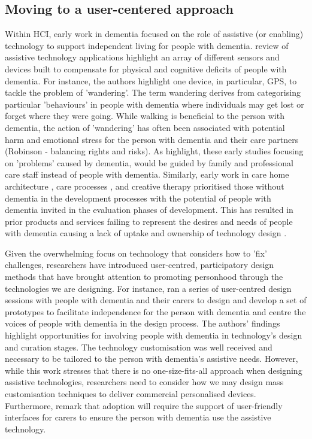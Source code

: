 \subsection{Moving to a user-centered approach}
\label{BL:Tech}
Within HCI, early work in dementia focused on the role of assistive (or enabling) technology to support independent living for people with dementia. \cite{bharucha2009intelligent} review of assistive technology applications highlight an array of different sensors and devices built to compensate for physical and cognitive deficits of people with dementia. For instance, the authors highlight one device, in particular, GPS, to tackle the problem of 'wandering'. The term wandering derives from categorising particular 'behaviours' in people with dementia where individuals may get lost or forget where they were going. While walking is beneficial to the person with dementia, the action of 'wandering' has often been associated with potential harm and emotional stress for the person with dementia and their care partners (Robinson - balancing rights and risks). As \cite{bharucha2009intelligent} highlight, these early studies focusing on 'problems' caused by dementia, would be guided by family and professional care staff instead of people with dementia. Similarly, early work in care home architecture \citep{torrington2006has}, care processes \citep{rabins2006practical}, and creative therapy \citep{schmitt2006creative} prioritised those without dementia in the development processes with the potential of people with dementia invited in the evaluation phases of development. This has resulted in prior products and services failing to represent the desires and needs of people with dementia causing a lack of uptake and ownership of technology design \citep{gibson2019personalisation}. 

Given the overwhelming focus on technology that considers how to 'fix' challenges, researchers have introduced user-centred, participatory design methods that have brought attention to promoting personhood through the technologies we are designing. For instance, \cite{robinson2009keeping} ran a series of user-centred design sessions with people with dementia and their carers to design and develop a set of prototypes to facilitate independence for the person with dementia and centre the voices of people with dementia in the design process. The authors' findings highlight opportunities for involving people with dementia in technology's design and curation stages. The technology customisation was well received and necessary to be tailored to the person with dementia's assistive needs. However, while this work stresses that there is no one-size-fits-all approach when designing assistive technologies, researchers need to consider how we may design mass customisation techniques to deliver commercial personalised devices. Furthermore, \cite{robinson2009keeping} remark that adoption will require the support of user-friendly interfaces for carers to ensure the person with dementia use the assistive technology. 

